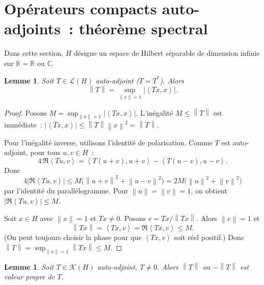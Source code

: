 \documentclass[a4paper,12pt]{book}
\newcommand{\R}{\mathbb{R}}
\newcommand{\C}{\mathbb{C}}
\newcommand{\K}{\mathbb{K}}
\newcommand{\norm}[1]{\left\| #1 \right\|}
\newcommand{\abs}[1]{\left| #1 \right|}
\newcommand{\inner}[2]{\left\langle #1, #2 \right\rangle}
\theoremstyle{definition}
\theoremstyle{plain}
\newtheorem{lemme}[definition]{Lemme}
\theoremstyle{remark}
\begin{document}
\section{Opérateurs compacts auto-adjoints~: théorème spectral}

Dans cette section, $H$ désigne un espace de Hilbert séparable de dimension infinie
sur $\K = \R$ ou $\C$.

\begin{lemme}
\label{lem:norme-autoadjoint}
Soit $T \in \mathcal{L}(H)$ auto-adjoint ($T = T^*$). Alors
\[
  \norm{T} = \sup_{\norm{x}=1} \abs{\inner{Tx}{x}}.
\]
\end{lemme}

\begin{proof}
Posons $M = \sup_{\norm{x}=1} \abs{\inner{Tx}{x}}$. L'inégalité $M \le \norm{T}$ est
immédiate~: $\abs{\inner{Tx}{x}} \le \norm{T}\norm{x}^2 = \norm{T}$.

Pour l'inégalité inverse, utilisons l'identité de polarisation. Comme $T$ est
auto-adjoint, pour tous $u, v \in H$~:
\[
  4\,\Re\inner{Tu}{v} = \inner{T(u+v)}{u+v} - \inner{T(u-v)}{u-v}.
\]
Donc
\[
  4\abs{\Re\inner{Tu}{v}} \le M\bigl(\norm{u+v}^2 + \norm{u-v}^2\bigr)
    = 2M\bigl(\norm{u}^2 + \norm{v}^2\bigr)
\]
par l'identité du parallélogramme. Pour
$\norm{u} = \norm{v} = 1$, on obtient $\abs{\Re\inner{Tu}{v}} \le M$.

Soit $x \in H$ avec $\norm{x} = 1$ et $Tx \neq 0$. Posons $v = Tx/\norm{Tx}$. Alors
$\norm{v} = 1$ et
\[
  \norm{Tx} = \inner{Tx}{v} = \Re\inner{Tx}{v} \le M.
\]
(On peut toujours choisir la phase pour que $\inner{Tx}{v}$ soit réel positif.)
Donc $\norm{T} = \sup_{\norm{x}=1} \norm{Tx} \le M$.
\end{proof}

\begin{lemme}
\label{lem:vp-extremale}
Soit $T \in \mathcal{K}(H)$ auto-adjoint, $T \neq 0$. Alors $\norm{T}$ ou $-\norm{T}$
est valeur propre de $T$.
\end{lemme}
\end{document}
